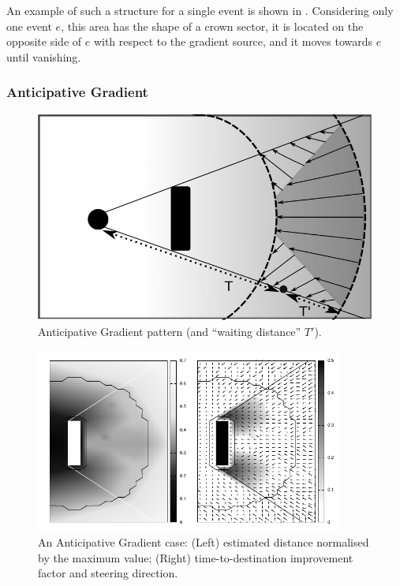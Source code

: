 \documentclass[12pt,a4paper,twoside,openright]{book}
\begin{document}
An example of such a structure for a single event is shown in .
%
Considering only one event $e$, this area has the shape of a crown sector, it is located on the opposite side of $e$ with respect to the gradient source, and it moves towards $e$ until vanishing.


\subsubsection{Anticipative Gradient}

\begin{figure}
	\begin{center}
		\includegraphics[width=\textwidth]{img/anticipatory_field}
\end{center}
\caption{Anticipative Gradient pattern (and ``waiting distance'' $T'$).}
\label{fig:aa} 
\end{figure}

\begin{figure}
	\begin{center}
		\includegraphics[width=0.9\textwidth]{img/matrix}
\end{center}
\caption[Anticipative Gradient]{An Anticipative Gradient case: (Left) estimated distance normalised by the maximum value; (Right) time-to-destination improvement factor and steering direction.}
\label{fig:2d} 
\end{figure}
\end{document}
